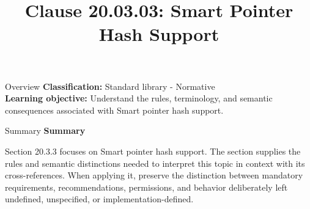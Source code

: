 \documentclass[10pt,letterpaper]{article}
\title{Clause 20.03.03: Smart Pointer Hash Support}
\author{}
\date{}
\begin{document}
\maketitle
\begin{CornellOverviewBox}{Overview}
\textbf{Classification:} Standard library - Normative\\[2pt]
\textbf{Learning objective:} Understand the rules, terminology, and semantic consequences associated with Smart pointer hash support.
\end{CornellOverviewBox}\begin{CornellSummaryBox}{Summary}
{\sffamily\bfseries\color{Accent} Summary}\par\vspace{3pt}Section 20.3.3 focuses on Smart pointer hash support. The section supplies the rules and semantic distinctions needed to interpret this topic in context with its cross-references. When applying it, preserve the distinction between mandatory requirements, recommendations, permissions, and behavior deliberately left undefined, unspecified, or implementation-defined.
\end{CornellSummaryBox}
\end{document}

